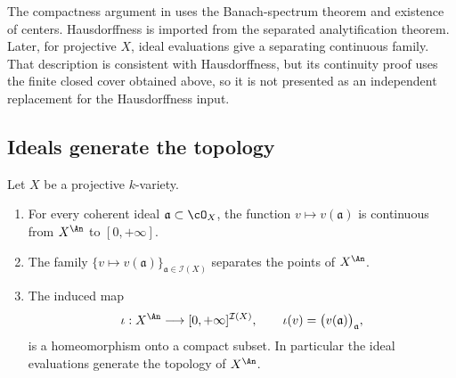 \begin{remark}
\label{rem:ch32-logical-order}
The compactness argument in  uses the
Banach-spectrum theorem and existence of centers.  Hausdorffness is
imported from the separated analytification theorem.  Later, for
projective $X$, ideal evaluations give a separating continuous family.
That description is consistent with Hausdorffness, but its continuity
proof uses the finite closed cover obtained above, so it is not presented
as an independent replacement for the Hausdorffness input.
\end{remark}

\subsection{Ideals generate the topology}
\label{sec:ch32-ideals-topology}

\begin{theorem}
\label{thm:ch32-ideals-generate}
Let $X$ be a projective $k$-variety.
\begin{enumerate}
\item\label{itm:ch32-ig:continuous}
For every coherent ideal $\mathfrak a\subset\cO_X$, the function
$v\mapsto v(\mathfrak a)$ is continuous from $X^{\An}$ to
$[0,+\infty]$.
\item\label{itm:ch32-ig:separate}
The family $\{v\mapsto v(\mathfrak a)\}_{\mathfrak a\in\mathcal I(X)}$
separates the points of $X^{\An}$.
\item\label{itm:ch32-ig:embed}
The induced map
\[
 \iota:X^{\An}\longrightarrow[0,+\infty]^{\mathcal I(X)},
 \qquad
 \iota(v)=\bigl(v(\mathfrak a)\bigr)_{\mathfrak a},
\]
is a homeomorphism onto a compact subset.  In particular the ideal
evaluations generate the topology of $X^{\An}$.
\end{enumerate}
\end{theorem}

